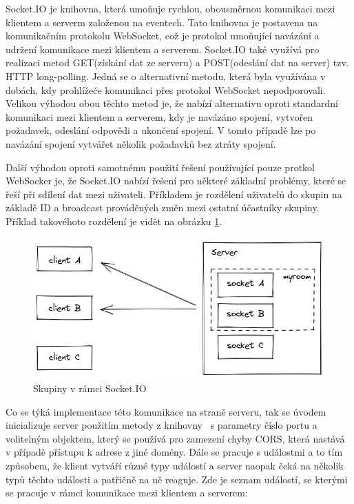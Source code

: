 Socket.IO je knihovna, která umoňuje rychlou, obousměrnou komunikaci mezi klientem a serverm založenou na eventech. \cite{socketIO} Tato knihovna je postavena na komunikačním protokolu WebSocket, což je protokol umoňující navázání a udržení komunikace mezi klientem a serverem. Socket.IO také využívá pro realizaci metod GET(získání dat ze serveru) a POST(odeslání dat na server) tzv. HTTP long-polling. Jedná se o alternativní metodu, která byla využívána v dobách, kdy prohlížeče komunikaci přes protokol WebSocket nepodporovali. Velikou výhodou obou těchto metod je, že nabízí alternativu oproti standardní komunikaci mezi klientem a serverem, kdy je navázáno spojení, vytvořen požadavek, odeslání odpovědi a ukončení spojení. V tomto případě lze po navázání spojení vytvářet několik požadavků bez ztráty spojení.

Další výhodou oproti samotnému použití řešení používající pouze protkol WebSocker je, že Socket.IO nabízí řešení pro některé základní problémy, které se řeší při sdílení dat mezi uživateli. Příkladem je rozdělení uživatelů do skupin na základě ID a broadcast prováděných změn mezi ostatní účastníky skupiny. Příklad takovéhoto rozdělení je vidět na obrázku \ref{fig:rooms}. 

\begin{figure}[h]
\centering
	\includegraphics[width=1.0\textwidth]{Figures/rooms.png}
	\caption{Skupiny v rámci Socket.IO}
	\label{fig:rooms}
\end{figure}

Co se týká implementace této komunikace na straně serveru, tak se úvodem inicializuje server použitím metody z knihovny  \  s parametry číslo portu a volitelným objektem, který se používá pro zamezení chyby CORS, která nastává v případě přístupu k adrese z jiné domény. Dále se pracuje s událostmi a to tím způsobem, že klient vytváří různé typy událostí a server naopak čeká na několik typů těchto události a patřičně na ně reaguje. Zde je seznam událostí, se kterými se pracuje v rámci komunikace mezi klientem a serverem: 

